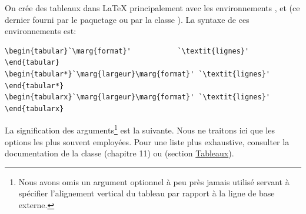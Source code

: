 On crée des tableaux dans {\LaTeX} principalement avec les
environnements ,  et  (ce
dernier fourni par le paquetage  ou par la classe
). La syntaxe de ces environnements est:
\begin{lstlisting}
\begin{tabular}`\marg{format}'           `\textit{lignes}' \end{tabular}
\begin{tabular*}`\marg{largeur}\marg{format}' `\textit{lignes}' \end{tabular*}
\begin{tabularx}`\marg{largeur}\marg{format}' `\textit{lignes}' \end{tabularx}
\end{lstlisting}
La signification des arguments\footnote{%
  Nous avons omis un argument optionnel à peu près jamais utilisé
  servant à spécifier l'alignement vertical du tableau par rapport à
  la ligne de base externe.} %
est la suivante. Nous ne traitons ici que les options les plus souvent
employées. Pour une liste plus exhaustive, consulter la documentation
de la classe  (chapitre 11) ou \cite{wikilivres:latex}
(section \href{http://fr.wikibooks.org/wiki/LaTeX/Tableaux}{Tableaux}).

